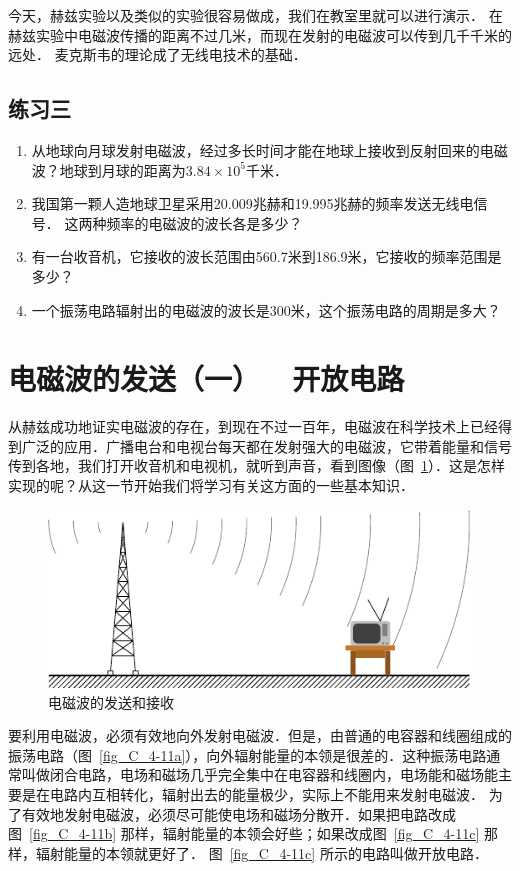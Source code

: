 今天，赫兹实验以及类似的实验很容易做成，我们在教室里就可以进行演示．
在赫兹实验中电磁波传播的距离不过几米，而现在发射的电磁波可以传到几千千米的远处．
麦克斯韦的理论成了无线电技术的基础．

\subsection*{练习三}
\begin{enumerate}
    \item 从地球向月球发射电磁波，经过多长时间才能在地球上接收到反射回来的电磁波？地球到月球的距离为$3.84\times10^5$千米．
    \item 我国第一颗人造地球卫星采用20.009兆赫和19.995兆赫的频率发送无线电信号．
    这两种频率的电磁波的波长各是多少？
    \item 有一台收音机，它接收的波长范围由560.7米到186.9米，它接收的频率范围是多少？
    \item 一个振荡电路辐射出的电磁波的波长是300米，这个振荡电路的周期是多大？
\end{enumerate}

\section{电磁波的发送（一）~~开放电路}
从赫兹成功地证实电磁波的存在，到现在不过一百年，电磁波在科学技术上已经得到广泛的应用．广播电台和电视台每天都在发射强大的电磁波，它带着能量和信号传到各地，我们打开收音机和电视机，就听到声音，看到图像（图~\ref{fig_C_4-10}）．这是怎样实现的呢？从这一节开始我们将学习有关这方面的一些基本知识．
\begin{figure}[htbp]
    \centering
    \includegraphics{fig/C/4-10.pdf}
    \caption{电磁波的发送和接收}\label{fig_C_4-10}
\end{figure}



要利用电磁波，必须有效地向外发射电磁波．但是，由普通的电容器和线圈组成的振荡电路（图~\ref{fig_C_4-11a}），向外辐射能量的本领是很差的．这种振荡电路通常叫做闭合电路，电场和磁场几乎完全集中在电容器和线圈内，电场能和磁场能主要是在电路内互相转化，辐射出去的能量极少，实际上不能用来发射电磁波．
为了有效地发射电磁波，必须尽可能使电场和磁场分散开．如果把电路改成图~\ref{fig_C_4-11b} 那样，辐射能量的本领会好些；如果改成图~\ref{fig_C_4-11c} 那样，辐射能量的本领就更好了．
图~\ref{fig_C_4-11c} 所示的电路叫做开放电路．

